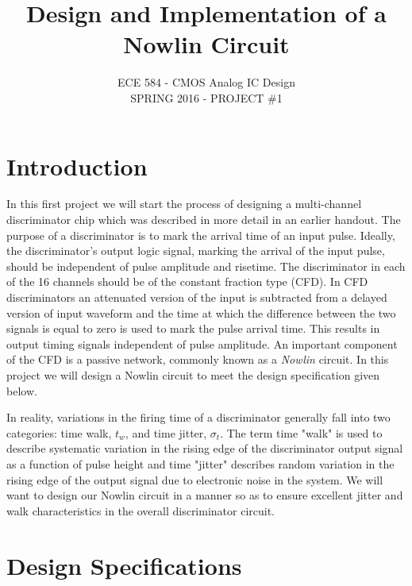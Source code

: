 \documentclass[12pt, onecolumn]{IEEEtran}
\author{ECE 584 - CMOS Analog IC Design\\
SPRING 2016 - PROJECT \#1\\
}
\title{Design and Implementation of a Nowlin Circuit}
\begin{document}

\maketitle


\section*{Introduction}

\noindent
In this first project we will start the process of designing a multi-channel discriminator chip which was described in more detail in an earlier handout. The purpose of a discriminator is to mark the arrival time of an input pulse. Ideally, the discriminator's output logic signal, marking the arrival of the input pulse, should be independent of pulse amplitude and risetime.  The discriminator in each of the 16 channels should be of the constant fraction type (CFD). In CFD discriminators an attenuated version of the input is subtracted from a delayed version of input waveform and the time at which the difference between the two signals is equal to zero is used to mark the pulse arrival time. This results in output timing signals independent of pulse amplitude. An important component of the CFD is a passive network, commonly known as a \emph{Nowlin} circuit. In this project we will design a Nowlin circuit to meet the design specification given below.

\noindent
\newline
In reality, variations in the firing time of a discriminator generally fall into two categories: time walk, $t_w$, and time jitter, $\sigma_t$. The term time "walk" is used to describe systematic variation in the rising edge of the discriminator output signal as a function of pulse height and time "jitter" describes random variation in the rising edge of the output signal due to electronic noise in the system.  We will want to design our Nowlin circuit in a manner so as to ensure excellent jitter and walk characteristics in the overall discriminator circuit.  \\  

\section*{Design Specifications}
\noindent
\end{document}
